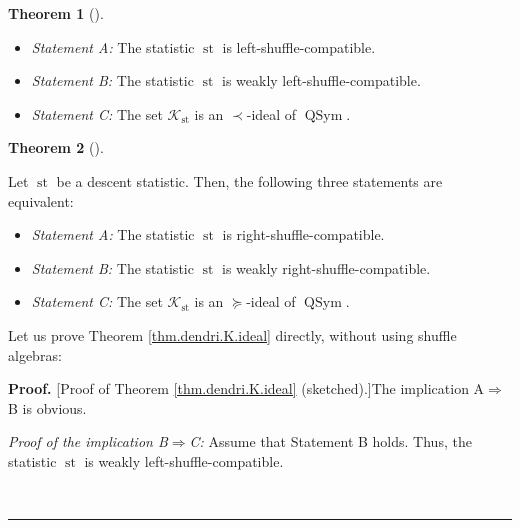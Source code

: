 \documentclass[numbers=enddot,12pt,final,onecolumn,notitlepage]{scrartcl}%
\theoremstyle{definition}
\newtheorem{theo}{Theorem}[section]
\newenvironment{theorem}[1][]
{\begin{theo}[#1]\begin{leftbar}}
{\end{leftbar}\end{theo}}
\newenvironment{proof}[1][Proof]{\noindent\textbf{#1.} }{\ \rule{0.5em}{0.5em}}
\newenvironment{verlong}{}{}
\begin{document}
\begin{verlong}
\begin{theorem}
\begin{itemize}
\item \textit{Statement A:} The statistic $\operatorname*{st}$ is left-shuffle-compatible.

\item \textit{Statement B:} The statistic $\operatorname*{st}$ is weakly left-shuffle-compatible.

\item \textit{Statement C:} The set $\mathcal{K}_{\operatorname*{st}}$ is an
$\left.  \prec\right.  $-ideal of $\operatorname*{QSym}$.
\end{itemize}
\end{theorem}

\begin{theorem}
\label{thm.dendri.K.ideal-R}Let $\operatorname*{st}$ be a descent statistic.
Then, the following three statements are equivalent:

\begin{itemize}
\item \textit{Statement A:} The statistic $\operatorname*{st}$ is right-shuffle-compatible.

\item \textit{Statement B:} The statistic $\operatorname*{st}$ is weakly right-shuffle-compatible.

\item \textit{Statement C:} The set $\mathcal{K}_{\operatorname*{st}}$ is an
$\left.  \succeq\right.  $-ideal of $\operatorname*{QSym}$.
\end{itemize}
\end{theorem}

Let us prove Theorem \ref{thm.dendri.K.ideal} directly, without using shuffle algebras:

\begin{proof}
[Proof of Theorem \ref{thm.dendri.K.ideal} (sketched).]The implication
A$\Longrightarrow$B is obvious.

\textit{Proof of the implication B}$\Longrightarrow$\textit{C:} Assume that
Statement B holds. Thus, the statistic $\operatorname*{st}$ is weakly left-shuffle-compatible.


\end{proof}
\end{verlong}
\end{document}
